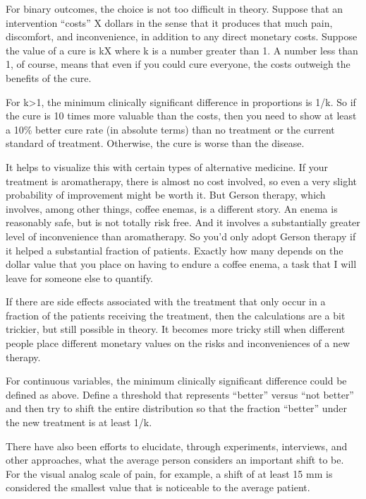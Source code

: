 \documentclass[
  letterpaper,
  DIV=11,
  numbers=noendperiod]{scrreprt}
\begin{document}
For binary outcomes, the choice is not too difficult in theory. Suppose
that an intervention ``costs'' X dollars in the sense that it produces
that much pain, discomfort, and inconvenience, in addition to any direct
monetary costs. Suppose the value of a cure is kX where k is a number
greater than 1. A number less than 1, of course, means that even if you
could cure everyone, the costs outweigh the benefits of the cure.

For k\textgreater1, the minimum clinically significant difference in
proportions is 1/k. So if the cure is 10 times more valuable than the
costs, then you need to show at least a 10\% better cure rate (in
absolute terms) than no treatment or the current standard of treatment.
Otherwise, the cure is worse than the disease.

It helps to visualize this with certain types of alternative medicine.
If your treatment is aromatherapy, there is almost no cost involved, so
even a very slight probability of improvement might be worth it. But
Gerson therapy, which involves, among other things, coffee enemas, is a
different story. An enema is reasonably safe, but is not totally risk
free. And it involves a substantially greater level of inconvenience
than aromatherapy. So you'd only adopt Gerson therapy if it helped a
substantial fraction of patients. Exactly how many depends on the dollar
value that you place on having to endure a coffee enema, a task that I
will leave for someone else to quantify.

If there are side effects associated with the treatment that only occur
in a fraction of the patients receiving the treatment, then the
calculations are a bit trickier, but still possible in theory. It
becomes more tricky still when different people place different monetary
values on the risks and inconveniences of a new therapy.

For continuous variables, the minimum clinically significant difference
could be defined as above. Define a threshold that represents ``better''
versus ``not better'' and then try to shift the entire distribution so
that the fraction ``better'' under the new treatment is at least 1/k.

There have also been efforts to elucidate, through experiments,
interviews, and other approaches, what the average person considers an
important shift to be. For the visual analog scale of pain, for example,
a shift of at least 15 mm is considered the smallest value that is
noticeable to the average patient.

\end{document}
